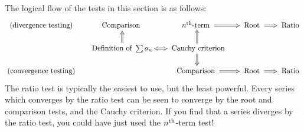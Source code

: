 The logical flow of the tests in this section is as follows:
\[
	\xymatrix @R15pt @C17pt{%
		\text{(divergence testing)} & \text{Comparison } & n^\text{th}\text{-term } \ar@{=>}[r] & \text{ Root } \ar@{=>}[r] & \text{ Ratio} \\
		\phantom{\text{(testing both)}} & \text{Definition of }\sum a_n \ar@{<=>}[r] \ar@{=>}[u] & \text{ Cauchy criterion} \ar@{=>}[u] \ar@{=>}[d] && \\
		\text{(convergence testing)} &&\text{Comparison } \ar@{=>}[r] & \text{ Root } \ar@{=>}[r] & \text{ Ratio}
	}
\] 
The ratio test is typically the easiest to use, but the least powerful. Every series which converges by the ratio test can be seen to converge by the root and comparison tests, and the Cauchy criterion. If you find that a series diverges by the ratio test, you could have just used the $n\textsuperscript{th}$-term test!

\clearpage


